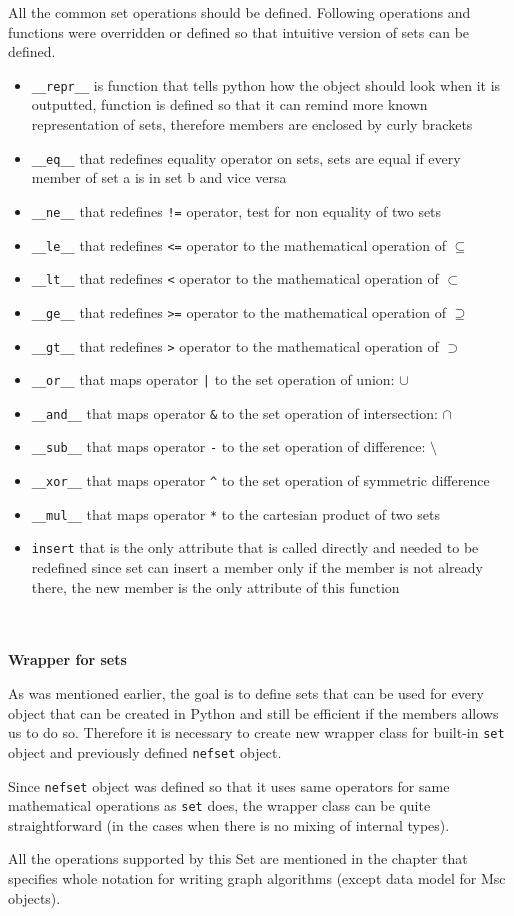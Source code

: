 \documentclass[11pt,oneside]{fithesis2}
\newcommand{\markit}[1]{\ \\\\{\noindent\textbf{#1}}}
\newcommand{\T}[1]{\texttt{#1}}
\newcommand{\ite}[1]{\item{\texttt{#1}}}
\begin{document}
All the common set operations should be defined. Following operations and functions were overridden or defined so that intuitive version of sets can be defined.
\begin{itemize}
\ite{\_\_repr\_\_} is function that tells python how the object should look when it is outputted, function is defined so that it can remind more known representation of sets, therefore members are enclosed by curly brackets
\ite{\_\_eq\_\_} that redefines equality operator on sets, sets are equal if every member of set a is in set b and vice versa
\ite{\_\_ne\_\_} that redefines \T{!=} operator, test for non equality of two sets
\ite{\_\_le\_\_} that redefines \T{<=} operator to the mathematical operation of $\subseteq$
\ite{\_\_lt\_\_} that redefines \T{<} operator to the mathematical operation of $\subset$
\ite{\_\_ge\_\_} that redefines \T{>=} operator to the mathematical operation of $\supseteq$
\ite{\_\_gt\_\_} that redefines \T{>} operator to the mathematical operation of $\supset$
\ite{\_\_or\_\_} that maps operator \T{|} to the set operation of union: $\cup$
\ite{\_\_and\_\_} that maps operator \T{\&} to the set operation of intersection: $\cap$
\ite{\_\_sub\_\_} that maps operator \T{-} to the set operation of difference: $\setminus$
\ite{\_\_xor\_\_} that maps operator \T{\^} to the set operation of symmetric difference
\ite{\_\_mul\_\_} that maps operator \T{*} to the cartesian product of two sets
\ite{insert} that is the only attribute that is called directly and needed to be redefined since set can insert a member only if the member is not already there, the new member is the only attribute of this function
\end{itemize}

\markit{Wrapper for sets}

As was mentioned earlier, the goal is to define sets that can be used for every object that can be created in Python and still be efficient if the members allows us to do so. Therefore it is necessary to create new wrapper class for built-in \T{set} object and previously defined \T{nefset} object.

Since \T{nefset} object was defined so that it uses same operators for same mathematical operations as \T{set} does, the wrapper class can be quite straightforward (in the cases when there is no mixing of internal types).

All the operations supported by this Set are mentioned in the chapter that specifies whole notation for writing graph algorithms (except data model for Msc objects).
\end{document}
